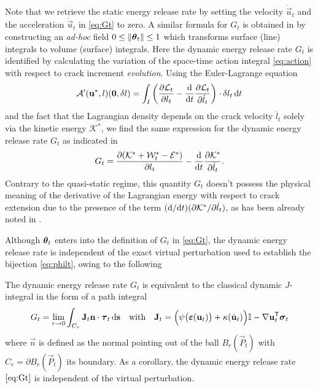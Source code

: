 Note that we retrieve the static energy release rate \cite{Destuynder:1981} by setting the velocity $\dot{\vec{u}}_t$ and the acceleration $\ddot{\vec{u}}_t$ in \eqref{eq:Gt} to zero. A similar formula for $G_t$ is obtained in \cite{AttiguiPetit:1996} by constructing an \emph{ad-hoc} field $0\leq\norm{\vtheta_t}\leq 1$ which transforms surface (line) integrals to volume (surface) integrals. Here the dynamic energy release rate $G_t$ is identified by calculating the variation of the space-time action integral \eqref{eq:action} with respect to crack increment \emph{evolution}. Using the Euler-Lagrange equation 
\[
\mathcal{A}'(\vec{u}^*,l)(\vec{0},\delta l)=\int_I\left(\frac{\partial\mathcal{L}_t}{\partial l_t}-\frac{\md}{\md t}\frac{\partial\mathcal{L}_t}{\partial\dot{l}_t}\right)\cdot\delta l_t\D{t}
\]
and the fact that the Lagrangian density depends on the crack velocity $\dot{l}_t$ solely via the kinetic energy $\mathcal{K}^*$, we find the same expression for the dynamic energy release rate $G_t$ as indicated in \cite[p.~423]{Freund:1990}
\[
G_t=\frac{\partial(\mathcal{K}^*+\mathcal{W}_t^*-\mathcal{E}^*)}{\partial l_t}-\frac{\mathrm{d}}{\mathrm{d} t}\frac{\partial\mathcal{K}^*}{\partial\dot{l}_t}.
\]
Contrary to the quasi-static regime, this quantity $G_t$ doesn't possess the physical meaning of the derivative of the Lagrangian energy with respect to crack extension due to the presence of the term $(\mathrm{d}/\mathrm{d} t)(\partial\mathcal{K}^*/\partial\dot{l}_t)$, as has been already noted in \cite{NishiokaAtluri:1983}.

Although $\vtheta_t$ enters into the definition of $G_t$ in \eqref{eq:Gt}, the dynamic energy release rate is independent of the exact virtual perturbation used to establish the bijection \eqref{eq:philt}, owing to the following
\begin{proposition} \label{prop:J}
The dynamic energy release rate $G_t$ is equivalent to the classical dynamic $J$-integral in the form of a path integral \cite{Freund:1990}
\begin{equation} \label{eq:Jdyn}
G_t=\lim_{r\to 0}\int_{C_r}\vec{J}_t\vec{n}\cdot\vtau_t\ds\quad\text{with}\quad\vec{J}_t=\Bigl(\psi\bigl(\eps(\vec{u}_t)\bigr)+\kappa(\dot{\vec{u}}_t)\Bigr)\mathbb{I}-\nabla\vec{u}_t^\mT\sig_t
\end{equation}
where $\vec{n}$ is defined as the normal pointing out of the ball $B_r(\vec{P}_t)$ with $C_r=\partial B_r(\vec{P}_t)$ its boundary. As a corollary, the dynamic energy release rate $\eqref{eq:Gt}$ is independent of the virtual perturbation.
\end{proposition}

